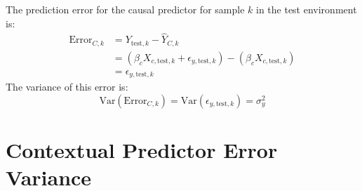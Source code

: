 \documentclass[11pt]{article}
\newcommand{\Var}{\mathrm{Var}}
\begin{document}
The prediction error for the causal predictor for sample $k$ in the test environment is:
\begin{align*}
    \text{Error}_{C,k} &= Y_{\text{test},k} - \hat{Y}_{C,k} \\
    &= (\beta_c X_{c,\text{test},k} + \epsilon_{y,\text{test},k}) - (\beta_c X_{c,\text{test},k}) \\
    &= \epsilon_{y,\text{test},k}
\end{align*}
The variance of this error is:
\begin{equation}
    \Var(\text{Error}_{C,k}) = \Var(\epsilon_{y,\text{test},k}) = \sigma_y^2
    \label{eq:causal_var}
\end{equation}

\section{Contextual Predictor Error Variance}
\end{document}
